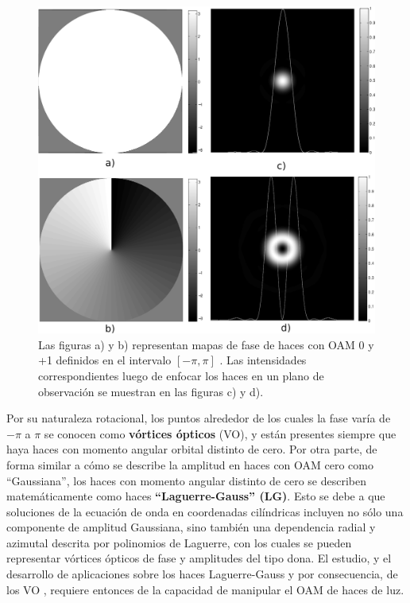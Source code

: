 \begin{figure}[h!]
\centering
\includegraphics[scale=.33]{oam_Intro}
\caption{ Las figuras a) y b) representan mapas de fase de haces con
  OAM 0 y +1 definidos en el intervalo $[- 
  \pi,\pi]$ . Las intensidades correspondientes luego de enfocar los haces en
  un plano de observación se muestran en las figuras c) y d).}
\label{fig:oam_intro}
\end{figure}

Por su naturaleza rotacional, los puntos alrededor de los cuales la fase
varía de $-\pi$  a $\pi$ se conocen como \textbf{vórtices ópticos} (VO), y
están presentes siempre que haya haces con momento angular 
orbital distinto de cero. Por otra parte, de forma similar a cómo se
describe la amplitud en haces con OAM cero como ``Gaussiana'', 
los haces con momento angular distinto de cero se describen
matemáticamente como haces \textbf{``Laguerre-Gauss'' (LG)}. Esto se debe a que
soluciones de la ecuación de onda en coordenadas
cilíndricas incluyen no sólo una componente de amplitud Gaussiana, sino
también una dependencia radial y azimutal descrita por polinomios de
Laguerre, con los cuales se pueden representar vórtices ópticos de fase
y amplitudes del tipo dona.       
El estudio, y el desarrollo de aplicaciones sobre los haces Laguerre-Gauss y por consecuencia, de los VO , requiere entonces de la
capacidad de manipular el OAM de haces de luz.  \\


